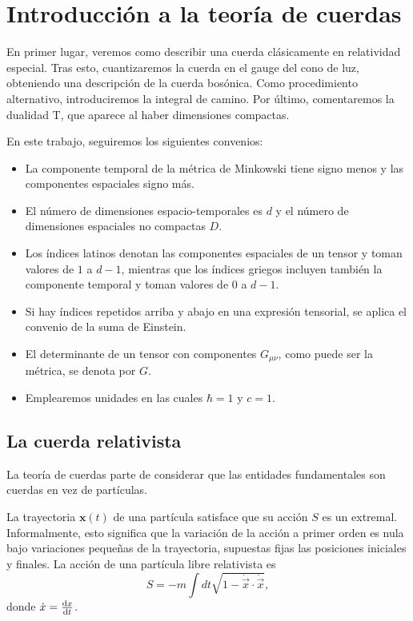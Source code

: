 \chapter{Introducción a la teoría de cuerdas}

En primer lugar, veremos como describir una cuerda clásicamente en relatividad especial.
Tras esto, cuantizaremos la cuerda en el gauge del cono de luz, obteniendo una descripción de la cuerda bosónica.
Como procedimiento alternativo, introduciremos la integral de camino.
Por último, comentaremos la dualidad T, que aparece al haber dimensiones compactas.

En este trabajo, seguiremos los siguientes convenios:
\begin{itemize}
  \item La  componente temporal de la métrica de Minkowski tiene signo menos y las componentes espaciales signo más.
  \item El número de dimensiones espacio-temporales es $d$ y el número de dimensiones espaciales no compactas $D$.
  \item Los índices latinos denotan las componentes espaciales de un tensor y toman valores de $1$ a $d-1$, mientras que los índices griegos
  incluyen también la componente temporal y toman valores de $0$ a $d-1$. 
  \item Si hay índices repetidos arriba y abajo en una expresión tensorial, se aplica el convenio de la suma de Einstein.
  \item El determinante de un tensor con componentes $G_{\mu\nu}$, como puede ser la métrica, se denota por $G$.
  \item Emplearemos unidades en las cuales $\hbar = 1$ y $c=1$.
\end{itemize}

\section{La cuerda relativista}

La teoría de cuerdas parte de considerar que las entidades fundamentales son cuerdas
en vez de partículas. 

La trayectoria $\mathbf x(t)$ de una partícula satisface que su acción $S$ es un extremal.
Informalmente, esto significa que la variación de la acción a primer orden es nula bajo
variaciones pequeñas de la trayectoria, supuestas fijas las posiciones iniciales y finales.
La acción de una partícula libre relativista es
\begin{equation}
  S=-m\int dt \sqrt{1-\dot {\vec{x}} \cdot \dot {\vec{x}}},
\end{equation}
donde $\dot x = \dv{x}{t}$.

